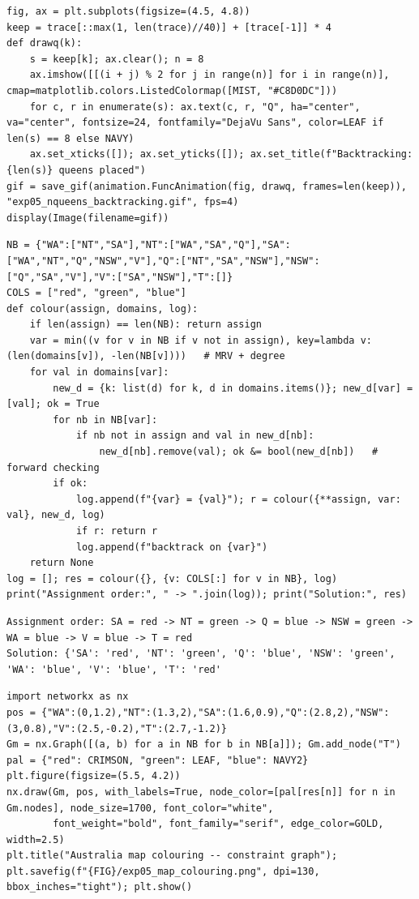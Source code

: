 \documentclass[11pt]{article}
\begin{document}
\begin{lstlisting}[style=py]
fig, ax = plt.subplots(figsize=(4.5, 4.8))
keep = trace[::max(1, len(trace)//40)] + [trace[-1]] * 4
def drawq(k):
    s = keep[k]; ax.clear(); n = 8
    ax.imshow([[(i + j) % 2 for j in range(n)] for i in range(n)], cmap=matplotlib.colors.ListedColormap([MIST, "#C8D0DC"]))
    for c, r in enumerate(s): ax.text(c, r, "Q", ha="center", va="center", fontsize=24, fontfamily="DejaVu Sans", color=LEAF if len(s) == 8 else NAVY)
    ax.set_xticks([]); ax.set_yticks([]); ax.set_title(f"Backtracking: {len(s)} queens placed")
gif = save_gif(animation.FuncAnimation(fig, drawq, frames=len(keep)), "exp05_nqueens_backtracking.gif", fps=4)
display(Image(filename=gif))
\end{lstlisting}
\begin{lstlisting}[style=py]
NB = {"WA":["NT","SA"],"NT":["WA","SA","Q"],"SA":["WA","NT","Q","NSW","V"],"Q":["NT","SA","NSW"],"NSW":["Q","SA","V"],"V":["SA","NSW"],"T":[]}
COLS = ["red", "green", "blue"]
def colour(assign, domains, log):
    if len(assign) == len(NB): return assign
    var = min((v for v in NB if v not in assign), key=lambda v: (len(domains[v]), -len(NB[v])))   # MRV + degree
    for val in domains[var]:
        new_d = {k: list(d) for k, d in domains.items()}; new_d[var] = [val]; ok = True
        for nb in NB[var]:
            if nb not in assign and val in new_d[nb]:
                new_d[nb].remove(val); ok &= bool(new_d[nb])   # forward checking
        if ok:
            log.append(f"{var} = {val}"); r = colour({**assign, var: val}, new_d, log)
            if r: return r
            log.append(f"backtrack on {var}")
    return None
log = []; res = colour({}, {v: COLS[:] for v in NB}, log)
print("Assignment order:", " -> ".join(log)); print("Solution:", res)
\end{lstlisting}
\begin{lstlisting}[style=out]
Assignment order: SA = red -> NT = green -> Q = blue -> NSW = green -> WA = blue -> V = blue -> T = red
Solution: {'SA': 'red', 'NT': 'green', 'Q': 'blue', 'NSW': 'green', 'WA': 'blue', 'V': 'blue', 'T': 'red'
\end{lstlisting}
\begin{lstlisting}[style=py]
import networkx as nx
pos = {"WA":(0,1.2),"NT":(1.3,2),"SA":(1.6,0.9),"Q":(2.8,2),"NSW":(3,0.8),"V":(2.5,-0.2),"T":(2.7,-1.2)}
Gm = nx.Graph([(a, b) for a in NB for b in NB[a]]); Gm.add_node("T")
pal = {"red": CRIMSON, "green": LEAF, "blue": NAVY2}
plt.figure(figsize=(5.5, 4.2))
nx.draw(Gm, pos, with_labels=True, node_color=[pal[res[n]] for n in Gm.nodes], node_size=1700, font_color="white",
        font_weight="bold", font_family="serif", edge_color=GOLD, width=2.5)
plt.title("Australia map colouring -- constraint graph"); plt.savefig(f"{FIG}/exp05_map_colouring.png", dpi=130, bbox_inches="tight"); plt.show()
\end{lstlisting}
\end{document}
